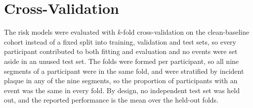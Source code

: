 \section{Cross-Validation}
\label{sec:method-cv}

The risk models were evaluated with $k$-fold cross-validation on the clean-baseline cohort instead of a fixed split into training, validation and test sets, so every participant contributed to both fitting and evaluation and no events were set aside in an unused test set.
The folds were formed per participant, so all nine segments of a participant were in the same fold, and were stratified by incident plaque in any of the nine segments, so the proportion of participants with an event was the same in every fold.
By design, no independent test set was held out, and the reported performance is the mean over the held-out folds.
